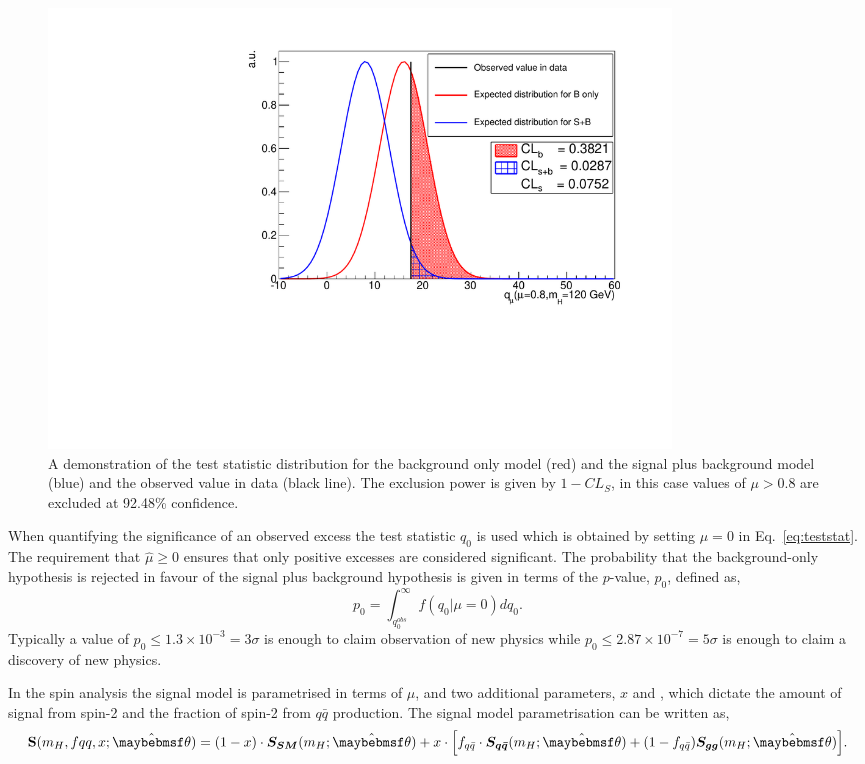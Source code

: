 \begin{figure}
  \begin{center}
    \includegraphics[width=0.8\textwidth]{analysis/plots/testStatDrawing.pdf}
    \caption[A demonstration of the test statistic distribution]{A demonstration of the test statistic distribution for the background only model (red) and the signal plus background model (blue) and the observed value in data (black line). The exclusion power is given by $1-CL_{S}$, in this case values of $\mu>0.8$ are excluded at 92.48\% confidence.}
    \label{fig:cls}
  \end{center}
\end{figure}

When quantifying the significance of an observed excess the test statistic $q_{0}$ is used which is obtained by setting $\mu=0$ in Eq.~\ref{eq:teststat}. The requirement that $\hat{\mu}\geq0$ ensures that only positive excesses are considered significant. The probability that the background-only hypothesis is rejected in favour of the signal plus background hypothesis is given in terms of the $p$-value, $p_{0}$, defined as,
\begin{equation}
  p_{0} = \int_{q_{0}^{obs}}^{\infty}f(q_{0}|\mu=0)dq_{0}.
  \label{eq:pvalue}
\end{equation}
Typically a value of $p_{0}\leq1.3\times10^{-3}=3\sigma$ is enough to claim observation of new physics while $p_{0}\leq2.87\times10^{-7}=5\sigma$ is enough to claim a discovery of new physics.

In the spin analysis the signal model is parametrised in terms of $\mu$, \mH and two additional parameters, $x$ and \fqqbar, which dictate the amount of signal from spin-2 and the fraction of spin-2 from $q\bar{q}$ production. The signal model parametrisation can be written as,
\begin{equation}
  \textbf{S}(m_{H},fqq,x;\hat{\theta}) = (1-x)\cdot\boldsymbol{S_{SM}}(m_{H};\hat{\theta})  + x\cdot\Bigl[f_{q\bar{q}}\cdot \boldsymbol{S_{q\bar{q}}}(m_{H};\hat{\theta}) + (1-f_{q\bar{q}})\boldsymbol{S_{gg}}(m_{H};\hat{\theta})\Bigr].  
  \label{eq:spin_sig}
\end{equation}

